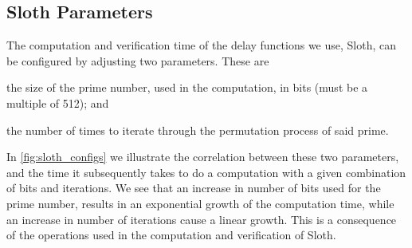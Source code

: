 \subsection{Sloth Parameters}%
\label{sub:sloth_parameters}

The computation and verification time of the delay functions we use, Sloth, can be configured by adjusting two parameters.
These are
\begin{eletterate*}
\item the size of the prime number, used in the computation, in bits (must be a multiple of 512); and
\item the number of times to iterate through the permutation process of said prime.
\end{eletterate*}

In \vref{fig:sloth_configs} we illustrate the correlation between these two parameters, and the time it subsequently takes to do a computation with a given combination of bits and iterations.
We see that an increase in number of bits used for the prime number, results in an exponential growth of the computation time, while an increase in number of iterations cause a linear growth.
This is a consequence of the operations used in the computation and verification of Sloth.

